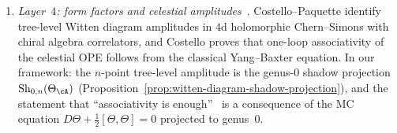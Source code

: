 \begin{remark}
\begin{enumerate}[label=\textup{(\roman*)}]
\item \emph{Layer~$4$: form factors and celestial
 amplitudes}~\cite{CostelloP2201,Costello2302}.
 Costello--Paquette identify tree-level
 Witten diagram amplitudes in $4$d holomorphic Chern--Simons
 with chiral algebra correlators, and Costello
 proves that one-loop associativity of the celestial OPE
 follows from the classical Yang--Baxter equation.
 In our framework: the $n$-point tree-level amplitude
 is the genus-$0$ shadow projection
 $\mathrm{Sh}_{0,n}(\Theta_\cA)$
 (Proposition~\ref{prop:witten-diagram-shadow-projection}),
 and the statement that ``associativity is
 enough''~\cite{FernandezCostelloP24} is
 a consequence of the MC equation
 $D\Theta + \tfrac{1}{2}[\Theta,\Theta] = 0$
 projected to genus~$0$.
\end{enumerate}
\end{remark}

